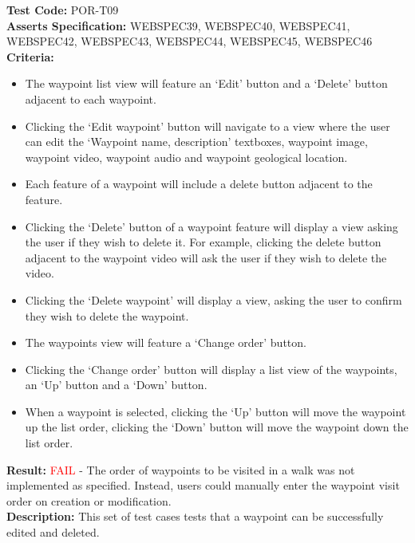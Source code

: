 \documentclass[11pt,a4paper]{report}
\begin{document}
\label{test:POR-T09}
\noindent\textbf{Test Code:} POR-T09\\
\textbf{Asserts Specification:} WEBSPEC39, WEBSPEC40, WEBSPEC41, WEBSPEC42, WEBSPEC43, WEBSPEC44, WEBSPEC45, WEBSPEC46\\ 
\textbf{Criteria:} \begin{itemize}
                     \item The waypoint list view will feature an `Edit' button and a `Delete' button adjacent to each waypoint.
                     \item Clicking the `Edit waypoint' button will navigate to a view where the user can edit the `Waypoint name, description' textboxes, waypoint image, waypoint video, waypoint audio and waypoint geological location.
                     \item Each feature of a waypoint will include a delete button adjacent to the feature.
                     \item Clicking the `Delete' button of a waypoint feature will display a view asking the user if they wish to delete it. For example, clicking the delete button adjacent to the waypoint video will ask the user if they wish to delete the video.
                     \item Clicking the `Delete waypoint' will display a view, asking the user to confirm they wish to delete the waypoint.
                     \item The waypoints view will feature a `Change order' button.
                     \item Clicking the `Change order' button will display a list view of the waypoints, an `Up' button and a `Down' button.
                     \item When a waypoint is selected, clicking the `Up' button will move the waypoint up the list order, clicking the `Down' button will move the waypoint down the list order.
                   \end{itemize}  
\textbf{Result:} \textcolor{red}{FAIL} - The order of waypoints to be visited in a walk was not implemented as specified. Instead, users could manually enter the waypoint visit order on creation or modification.\\
\textbf{Description:} This set of test cases tests that a waypoint can be successfully edited and deleted. \\
\end{document}
